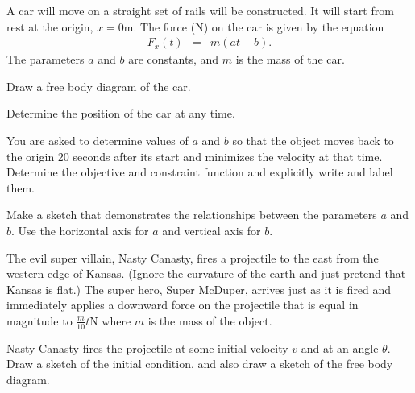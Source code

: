 \begin{problem}
\item A car will move on a straight set of rails will be
  constructed. It will start from rest at the origin, $x=0$m. The
  force (N) on the car is given by the equation
  \begin{eqnarray*}
    F_x(t) & = & m(at + b).
  \end{eqnarray*}
  The parameters $a$ and $b$ are constants, and $m$ is the mass of the
  car.

  \begin{subproblem}
    \item Draw a free body diagram of the car.
      \vfill
    \item Determine the position of the car at any time. 
      \vfill

      \clearpage
      
    \item You are asked to determine values of $a$ and $b$ so that the
      object moves back to the origin 20 seconds after its start and
      minimizes the velocity at that time. Determine the objective and
      constraint function and explicitly write and label them.

      \vfill

    \item Make a sketch that demonstrates the relationships between
      the parameters $a$ and $b$. Use the horizontal axis for $a$ and
      vertical axis for $b$.

      \vfill

  \end{subproblem}

  \clearpage

\item The evil super villain, Nasty Canasty, fires a projectile to the
  east from the western edge of Kansas.  (Ignore the curvature of the
  earth and just pretend that Kansas is flat.)  The super hero, Super
  McDuper, arrives just as it is fired and immediately applies a
  downward force on the projectile that is equal in magnitude to
  $\frac{m}{10}t$N where $m$ is the mass of the object.

  \begin{subproblem}
  \item Nasty Canasty fires the projectile at some initial velocity
    $v$ and at an angle $\theta$. Draw a sketch of the initial
    condition, and also draw a sketch of the free body diagram.


\end{subproblem}
\end{problem}
